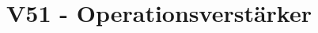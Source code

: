 

\subject{Fortgeschrittenenpraktikum}
\title{V51 - Operationsverstärker}



\maketitle

\thispagestyle{empty}


\newpage

\tableofcontents
\newpage






\nocite{*}
\newpage
\printbibliography{}


